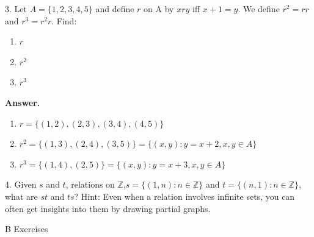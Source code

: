 \documentclass[10pt,]{book}
\theoremstyle{plain}
\theoremstyle{definition}
\theoremstyle{definition}
\theoremstyle{definition}
\theoremstyle{definition}
\begin{document}
\begin{exercisegroup}
\begin{enumerate}[label=\alph*]
\end{enumerate}
%
\par\smallskip
\item[3.]\hypertarget{exercise-3}{} Let \(A = \{1,2,3,4,5\}\) and define \(r\) on A by \(x r y\) iff \(x + 1 = y\). We
define \(r^2 = r r\) and \(r^3 = r^2 r\). Find:%
\par
\leavevmode%
\begin{enumerate}[label=\alph*]
\item\hypertarget{li-11}{} \(r\)%
\item\hypertarget{li-12}{} \(r^2\)%
\item\hypertarget{li-13}{} \(r^3\)%
\end{enumerate}
%
\par\smallskip
\par\smallskip
\noindent\textbf{Answer.}\hypertarget{answer-2}{}\quad
\leavevmode%
\begin{enumerate}[label=\alph*]
\item\hypertarget{li-14}{} \(r=\{(1,2), (2,3), (3,4), (4,5)\}\)%
\item\hypertarget{li-15}{} \(r^2 = \{(1,3), (2,4), (3,5)\}=\{(x,y) : y=x+2, x,y\in A\}\)%
\item\hypertarget{li-16}{} \(r^3=\{(1,4), (2,5)\}=\{(x,y) : y=x+3, x,y \in  A\}\) %
\end{enumerate}
%
\item[4.]\hypertarget{exercise-4}{} Given \(s\) and \(t\), relations on \(\mathbb{Z}\),\( s = \{(1, n) : n \in \mathbb{Z}\}\) and \(t= \{(n, 1) : n \in  \mathbb{Z}\}\),
what are \(st\) and \(ts\)? Hint: Even when a relation involves infinite sets, you can often get insights into them by drawing
partial graphs.%
\par\smallskip
\end{exercisegroup}
\par\smallskip\noindent
\hypertarget{exercisegroup-2}{}\typeout{************************************************}
\typeout{************************************************}
B Exercises%
\end{document}
